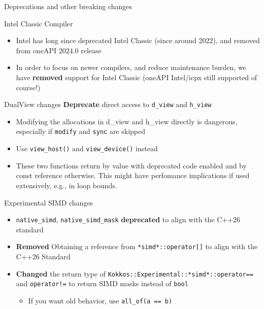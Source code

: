 
\begin{frame}[fragile]

  {\Huge Deprecations and other breaking changes}

  \vspace{10pt}

\end{frame}


\begin{frame}[fragile]{Intel Classic Compiler}
  \begin{itemize}
    \item Intel has long since deprecated Intel Classic (since around 2022), and removed from oneAPI 2024.0 release
    \item In order to focus on newer compilers, and reduce maintenance burden, we have \textbf{removed} support for Intel Classic (oneAPI Intel/icpx still supported of course!)
  \end{itemize}
\end{frame}


\begin{frame}[fragile]{DualView changes}
  \textbf{Deprecate} direct access to \texttt{d\_view} and \texttt{h\_view}
  \begin{itemize}
    \item Modifying the allocations in d\_view and h\_view directly is dangerous, especially if \texttt{modify} and \texttt{sync} are skipped
    \item Use \texttt{view\_host()} and \texttt{view\_device()} instead
    \item These two functions return by value with deprecated code enabled and by const reference otherwise. This might have perfomance implications if used extensively, e.g., in loop bounds.
  \end{itemize}
\end{frame}


\begin{frame}[fragile]{Experimental SIMD changes}
  \begin{itemize}
    \item \texttt{native\_simd}, \texttt{native\_simd\_mask} \textbf{deprecated} to align with the C++26 standard
    \item \textbf{Removed} Obtaining a reference from \texttt{*simd*::operator[]} to align with the C++26 Standard
    \item \textbf{Changed} the return type of \texttt{Kokkos::Experimental::*simd*::operator==} and \texttt{operator!=} to return SIMD masks instead of \texttt{bool}
    \begin{itemize}
      \item If you want old behavior, use \texttt{all\_of(a == b)}
    \end{itemize}
  \end{itemize}
\end{frame}

